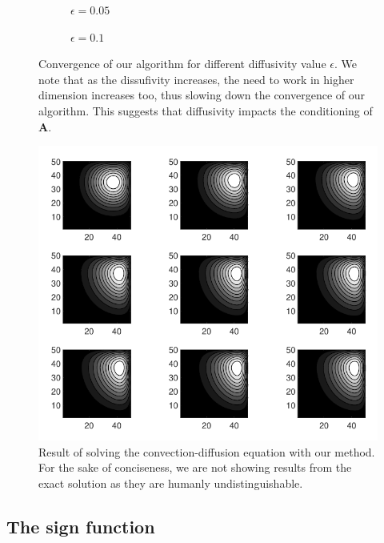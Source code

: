 \documentclass[11pt]{article}
\numberwithin{equation}{section}
\begin{document}
\begin{figure}
    \begin{subfigure}[b]{.45\linewidth}
        
        \caption{$\epsilon = 0.05$}
        \label{fig:ode_0.05}
    \end{subfigure}\hspace{.05\linewidth}
    \begin{subfigure}[b]{.45\linewidth}
        
        \caption{$\epsilon = 0.1$}
        \label{fig:ode_0.1}
    \end{subfigure}
    \caption{Convergence of our algorithm for different diffusivity value $\epsilon$. We note that as the dissufivity increases, the need to work in higher dimension increases too, thus slowing down the convergence of our algorithm. This suggests that diffusivity impacts the conditioning of $\mathbf{A}$.}
    \label{fig:ode_eps}
\end{figure}

\begin{figure}
    \centering
    \includegraphics[width=.7\linewidth]{figures/convection_krylov.pdf}
    \caption{Result of solving the convection-diffusion equation with our method. For the sake of conciseness, we are not showing results from the exact solution as they are humanly undistinguishable.}
\end{figure}

\subsection{The sign function}\label{sec:sign}
\end{document}
